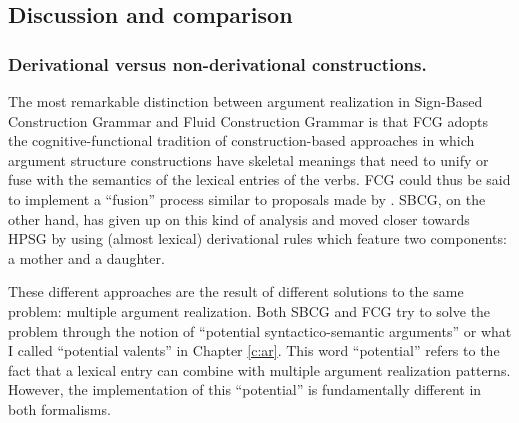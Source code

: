 \subsection{Discussion and comparison}
\label{s:active-passive}

\subsubsection{Derivational versus non-derivational constructions.}

The most remarkable distinction between argument realization in Sign-Based Construction Grammar and Fluid Construction Grammar is that FCG adopts the cognitive-functional tradition of construction-based approaches in which argument structure constructions have skeletal meanings that need to unify or fuse with the semantics of the lexical entries of the verbs. FCG could thus be said to implement a ``fusion'' process similar to proposals made by \citet{goldberg95construction}. SBCG, on the other hand, has given up on this kind of analysis and moved closer towards HPSG by using (almost lexical) derivational rules which feature two components: a mother and a daughter.

\largerpage
These different approaches are the result of different solutions to the same problem: multiple argument realization. Both SBCG and FCG try to solve the problem through the notion of ``potential syntactico-semantic arguments'' \citep{sag07sbcg} or what I called ``potential valents'' in Chapter \ref{c:ar}. This word ``potential'' refers to the fact that a lexical entry can combine with multiple argument realization patterns. However, the implementation of this ``potential'' is fundamentally different in both formalisms.


